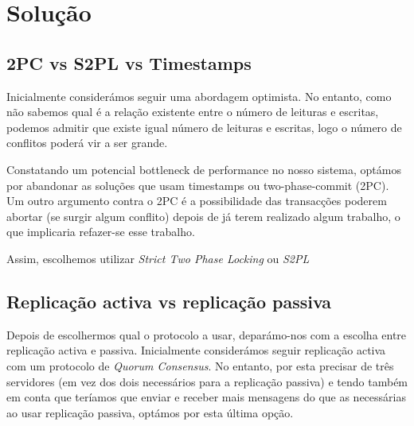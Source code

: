 \section{Solução}

\subsection{2PC vs S2PL vs Timestamps}

Inicialmente considerámos seguir uma abordagem optimista. No entanto, como não sabemos qual é a relação existente entre o número de leituras e escritas, podemos admitir que existe igual número de leituras e escritas, logo o número de conflitos poderá vir a ser grande. 

Constatando um potencial bottleneck de performance no nosso sistema, optámos por abandonar as soluções que usam timestamps ou two-phase-commit (2PC). Um outro argumento contra o 2PC é a possibilidade das transacções poderem abortar (se surgir algum conflito) depois de já terem realizado algum trabalho, o que implicaria refazer-se esse trabalho.

Assim, escolhemos utilizar \textit{Strict Two Phase Locking} ou \textit{S2PL}

\subsection{Replicação activa vs replicação passiva}

Depois de escolhermos qual o protocolo a usar, deparámo-nos com a escolha entre replicação activa e passiva. Inicialmente considerámos seguir replicação activa com um protocolo de \textit{Quorum Consensus}. No entanto, por esta precisar de três servidores (em vez dos dois necessários para a replicação passiva) e tendo também em conta que teríamos que enviar e receber mais mensagens do que as necessárias ao usar replicação passiva, optámos por esta última opção.
